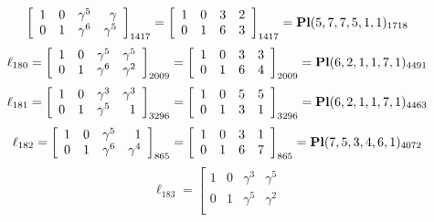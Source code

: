 \documentclass{article}
\begin{document}
{$$\left[
\begin{array}{*{4}{r}}
1 & 0 & \gamma^{5} & \gamma \\
0 & 1 & \gamma^{6} & \gamma^{5}\\
\end{array}
\right]
_{1417}
=
\left[
\begin{array}{*{4}c}
1  & 0  & 3  & 2\\
0  & 1  & 6  & 3\\
\end{array}
\right]_{1417}
={\rm\bf Pl}(5,7,7,5,1,1 )_{1718}$$
$$
\ell_{180} = 
\left[
\begin{array}{*{4}{r}}
1 & 0 & \gamma^{5} & \gamma^{5}\\
0 & 1 & \gamma^{6} & \gamma^{2}\\
\end{array}
\right]
_{2009}
=
\left[
\begin{array}{*{4}c}
1  & 0  & 3  & 3\\
0  & 1  & 6  & 4\\
\end{array}
\right]_{2009}
={\rm\bf Pl}(6,2,1,1,7,1 )_{4491}$$
$$
\ell_{181} = 
\left[
\begin{array}{*{4}{r}}
1 & 0 & \gamma^{3} & \gamma^{3}\\
0 & 1 & \gamma^{5} & 1\\
\end{array}
\right]
_{3296}
=
\left[
\begin{array}{*{4}c}
1  & 0  & 5  & 5\\
0  & 1  & 3  & 1\\
\end{array}
\right]_{3296}
={\rm\bf Pl}(6,2,1,1,7,1 )_{4463}$$
$$
\ell_{182} = 
\left[
\begin{array}{*{4}{r}}
1 & 0 & \gamma^{5} & 1\\
0 & 1 & \gamma^{6} & \gamma^{4}\\
\end{array}
\right]
_{865}
=
\left[
\begin{array}{*{4}c}
1  & 0  & 3  & 1\\
0  & 1  & 6  & 7\\
\end{array}
\right]_{865}
={\rm\bf Pl}(7,5,3,4,6,1 )_{4072}$$
$$
\ell_{183} = 
\left[
\begin{array}{*{4}{r}}
1 & 0 & \gamma^{3} & \gamma^{5}\\
0 & 1 & \gamma^{5} & \gamma^{2}\\
\end{array}
$$}
\end{document}

